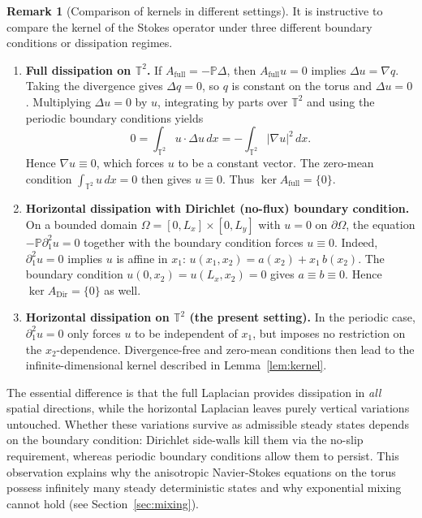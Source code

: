 \documentclass[11pt,a4paper,reqno]{amsart}
\theoremstyle{definition}
\newtheorem{remark}[theorem]{Remark}
\newcommand{\PP}{\mathbb{P}}
\begin{document}
\begin{remark}[Comparison of kernels in different settings]\label{rmk:kernel_comparison}
  It is instructive to compare the kernel of the Stokes operator under three different
  boundary conditions or dissipation regimes.
  \begin{enumerate}
   \item \textbf{Full dissipation on $\mathbb{T}^2$.}
  If $A_{\mathrm{full}} = -\PP\Delta$, then $A_{\mathrm{full}} u = 0$ implies $\Delta u = \nabla q$.
  Taking the divergence gives $\Delta q = 0$, so $q$ is constant on the torus and $\Delta u = 0$.
  Multiplying $\Delta u = 0$ by $u$, integrating by parts over $\mathbb{T}^2$ and using the
  periodic boundary conditions yields
  \[
    0 = \int_{\mathbb{T}^2} u \cdot \Delta u \,dx = -\int_{\mathbb{T}^2} |\nabla u|^2 \,dx .
  \]
  Hence $\nabla u \equiv 0$, which forces $u$ to be a constant vector.  The zero-mean condition
  $\int_{\mathbb{T}^2} u\,dx = 0$ then gives $u \equiv 0$.  Thus $\ker A_{\mathrm{full}} = \{0\}$.
    \item \textbf{Horizontal dissipation with Dirichlet (no-flux) boundary condition.}
      On a bounded domain $\Omega=[0,L_x]\times[0,L_y]$ with $u=0$ on $\partial\Omega$,
      the equation $-\mathbb{P}\partial_1^2 u = 0$ together with the boundary condition forces
      $u\equiv 0$.  Indeed, $\partial_1^2 u = 0$ implies $u$ is affine in $x_1$:
      $u(x_1,x_2) = a(x_2) + x_1\,b(x_2)$.  The boundary condition $u(0,x_2)=u(L_x,x_2)=0$
      gives $a\equiv b\equiv 0$.  Hence $\ker A_{\mathrm{Dir}} = \{0\}$ as well.
    \item \textbf{Horizontal dissipation on $\mathbb{T}^2$ (the present setting).}
      In the periodic case, $\partial_1^2 u = 0$ only forces $u$ to be independent of $x_1$,
      but imposes no restriction on the $x_2$-dependence.  Divergence-free and zero-mean
      conditions then lead to the infinite-dimensional kernel described in Lemma~\ref{lem:kernel}.
  \end{enumerate}
  The essential difference is that the full Laplacian provides dissipation in \emph{all} spatial
  directions, while the horizontal Laplacian leaves purely vertical variations untouched.
  Whether these variations survive as admissible steady states depends on the boundary condition:
  Dirichlet side-walls kill them via the no-slip requirement, whereas periodic boundary conditions
  allow them to persist.  This observation explains why the anisotropic Navier-Stokes equations on
  the torus possess infinitely many steady deterministic states and why exponential mixing cannot
  hold (see Section~\ref{sec:mixing}).
\end{remark}
\end{document}

